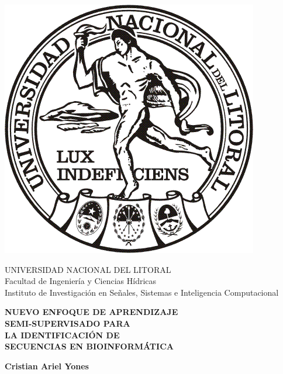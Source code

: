 \thispagestyle{empty}

\begin {center}

\includegraphics[scale=.25]{fig/logo_unl.png}

{\large UNIVERSIDAD NACIONAL DEL LITORAL}\\
{Facultad de Ingeniería y Ciencias Hídricas\\Instituto de Investigación en Señales, Sistemas e Inteligencia Computacional}

\vspace{3cm}
\textbf{\Large NUEVO ENFOQUE DE APRENDIZAJE}\\[0.1 cm]
\textbf{\Large SEMI-SUPERVISADO PARA}\\[0.1 cm]
\textbf{\Large LA IDENTIFICACIÓN DE}\\[0.1 cm]
\textbf{\Large SECUENCIAS EN BIOINFORMÁTICA}\\[0.1 cm]
\vspace{1cm}

\textbf{\large Cristian Ariel Yones}\\

\vspace{1cm}

\end{center}

